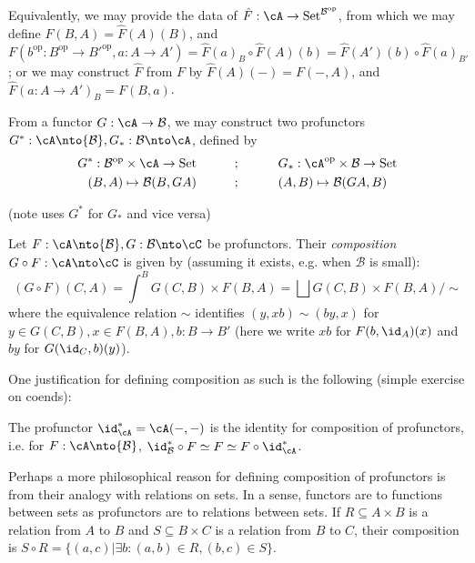 \documentclass[12pt]{article}
\newcommand{\op}{{\text{op}}}
\newcommand{\cB}{{\mathcal{B}}}
\DeclareMathOperator{\Set}{Set}
\begin{document}
\begin{remark}
\label{r:profunctor-alt}
Equivalently, we may provide the data of
$\hat{F} : \cA \to \Set^{\cB^\op}$,
from which we may define $F(B,A) = \hat{F}(A)(B)$,
and $F(b^\op: B^\op \to B'^\op,a: A \to A')
= \hat{F}(a)_B \circ \hat{F}(A)(b)
= \hat{F}(A')(b) \circ \hat{F}(a)_{B'}$;
or we may construct $\hat{F}$ from $F$ by
$\hat{F}(A)(-) = F(-,A)$,
and $\hat{F}(a:A \to A')_B = F(B,a)$.
\end{remark}

\begin{example}
From a functor $G: \cA \to \cB$,
we may construct two profunctors
$G^*: \cA \nto \cB, G_*: \cB \nto \cA$,
defined by
\begin{align*}
G^* : \cB^\op \times \cA \to \Set
\hspace{30pt}
&;
\hspace{30pt}
G_* : \cA^\op \times \cB \to \Set
\\
(B, A) \mapsto \cB(B, GA)
\hspace{30pt}
&;
\hspace{30pt}
(A, B) \mapsto \cB(GA, B)
\end{align*}

(note \cite{Lawvere} uses $G^*$ for $G_*$ and
vice versa)
\end{example}

\begin{definition}
Let $F: \cA \nto \cB, G: \cB \nto \cC$
be profunctors.
Their \emph{composition}
$G \circ F: \cA \nto \cC$
is given by
(assuming it exists, e.g. when $\cB$ is small):
\[
(G \circ F)(C,A) =
\int^B G(C,B) \times F(B,A)
=
\bigsqcup G(C,B) \times F(B,A) / \sim
\]
where the equivalence relation $\sim$
identifies $(y, xb) \sim (by,x)$
for $y \in G(C,B), x \in F(B,A), b: B \to B'$
(here we write $xb$ for $F(b,\id_A)(x)$
and $by$ for $G(\id_C,b)(y)$).
\end{definition}

One justification for defining composition as such is
the following (simple exercise on coends):

\begin{lemma}
\label{l:id-profunctor}
The profunctor $\id_\cA^* = \cA(-,-)$ is
the identity for composition of profunctors,
i.e. for $F: \cA \nto \cB$,
$\id_\cB^* \circ F \simeq F \simeq F \circ \id_\cA^*$.
\end{lemma}

Perhaps a more philosophical reason for defining
composition of profunctors is from
their analogy with relations on sets.
In a sense, functors are to functions between sets
as profunctors are to relations between sets.
If $R \subseteq A \times B$ is a relation from $A$ to $B$
and $S \subseteq B \times C$ is a relation from $B$ to $C$,
their composition is
$S \circ R = \{(a,c) | \exists b: (a,b) \in R, (b,c) \in S\}$.
\end{document}
